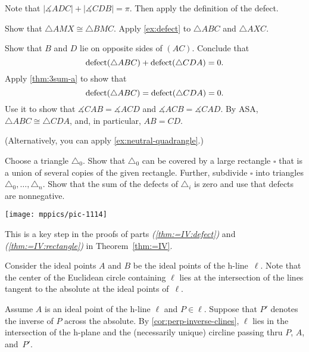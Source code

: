 Note that 
$|\measuredangle ADC|+|\measuredangle CDB|=\pi$.
Then apply the definition of the defect.

Show that $\triangle AMX\cong \triangle BMC$. 
Apply \ref{ex:defect} to $\triangle ABC$ and $\triangle AXC$.


Show that $B$ and $D$ lie on opposite sides of $(AC)$.
Conclude that 
\[\mathop{\rm defect}\nolimits(\triangle ABC)+\mathop{\rm defect}\nolimits(\triangle CDA)=0.\]
Apply \ref{thm:3sum-a} to show that 
\[\mathop{\rm defect}\nolimits(\triangle ABC)=\mathop{\rm defect}\nolimits(\triangle CDA)=0.\]
Use it to show that $\measuredangle CAB=\measuredangle ACD$ and $\measuredangle ACB=\measuredangle CAD$.
By ASA, $\triangle ABC\cong\triangle CDA$, and, in particular, $AB=CD$.

(Alternatively, you can apply \ref{ex:neutral-quadrangle}.)

Choose a triangle $\triangle_0$.
Show that $\triangle_0$ can be covered by a large rectangle $\square$ that is a union of several copies of the given rectangle.
Further, subdivide $\square$ into triangles $\triangle_0,\dots, \triangle_n$.
Show that the sum of the defects of $\triangle_i$ is zero and use that defects are nonnegative.

\begin{Figure}
\vskip-0mm
\centering
\texttt{[image: mppics/pic-1114]}
\end{Figure}

This is a key step in the proofs of parts \textit{(\ref{thm:=IV:defect})} and \textit{(\ref{thm:=IV:rectangle})} in Theorem~\ref{thm:=IV}.


\setcounter{eqtn}{0}

Consider the ideal points $A$ and $B$ be the ideal points of the h-line~$\ell$. 
Note that the center of the Euclidean circle containing $\ell$ lies 
at the intersection of the lines tangent to the absolute at the ideal points of~$\ell$.

Assume $A$ is an ideal point of the h-line $\ell$
and $P\in \ell$.
Suppose that $P'$ denotes the inverse of $P$ across the absolute.
By \ref{cor:perp-inverse-clines},
$\ell$ lies in the intersection of the h-plane and the (necessarily unique) circline 
passing thru $P$, $A$, and~$P'$.

